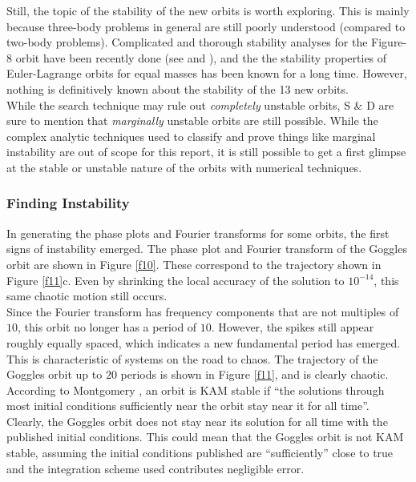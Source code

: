 \documentclass[12pt]{article}
\begin{document}
Still, the topic of the stability of the new orbits is worth exploring. This is mainly because three-body problems in general are still poorly understood (compared to two-body problems). Complicated and thorough stability analyses for the Figure-8 orbit have been recently done (see \cite{fig8} and \cite{mont}), and the the stability properties of Euler-Lagrange orbits for equal masses has been known for a long time. However, nothing is definitively known about the stability of the 13 new orbits. \\

While the search technique may rule out \emph{completely} unstable orbits, S \& D are sure to mention that \emph{marginally} unstable orbits are still possible. While the complex analytic techniques used to classify and prove things like marginal instability are out of scope for this report, it is still possible to get a first glimpse at the stable or unstable nature of the orbits with numerical techniques.

\subsubsection{Finding Instability}

In generating the phase plots and Fourier transforms for some orbits, the first signs of instability emerged. The phase plot and Fourier transform of the Goggles orbit are shown in Figure \ref{f10}. These correspond to the trajectory shown in Figure \ref{f11}c. Even by shrinking the local accuracy of the solution to $10^{-14}$, this same chaotic motion still occurs.\\

Since the Fourier transform has frequency components that are not multiples of $10$, this orbit no longer has a period of $10$. However, the spikes still appear roughly equally spaced, which indicates a new fundamental period has emerged. This is characteristic of systems on the road to chaos. The trajectory of the Goggles orbit up to $20$ periods is shown in Figure \ref{f11}, and is clearly chaotic. \\

According to Montgomery \cite{mont}, an orbit is KAM stable if ``the solutions through most initial conditions sufficiently near the orbit stay near it for all time''. Clearly, the Goggles orbit does not stay near its solution for all time with the published initial conditions. This could mean that the Goggles orbit is not KAM stable, assuming the initial conditions published are ``sufficiently'' close to true and the integration scheme used contributes negligible error. \\
\end{document}
